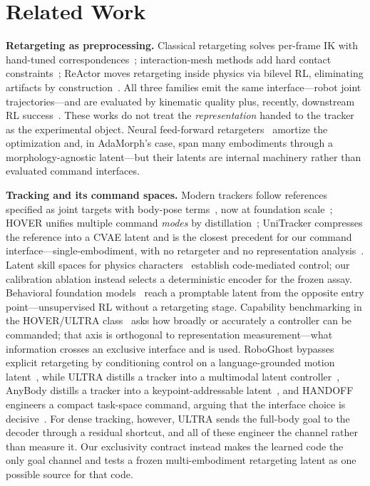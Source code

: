 \documentclass[conference]{IEEEtran}
\begin{document}
\section{Related Work}
\textbf{Retargeting as preprocessing.} Classical retargeting solves per-frame IK with
hand-tuned correspondences~\cite{gmr}; interaction-mesh methods add hard contact
constraints~\cite{omniretarget}; ReActor moves retargeting inside physics via bilevel RL,
eliminating artifacts by construction~\cite{reactor}. All three families emit the same
interface---robot joint trajectories---and are evaluated by kinematic quality plus,
recently, downstream RL success~\cite{gmr,omniretarget}. These works do not treat the
\emph{representation} handed to the tracker as the experimental object. Neural feed-forward
retargeters~\cite{ikmr,nmr,adamorph} amortize the optimization and, in AdaMorph's case,
span many embodiments through a morphology-agnostic latent---but their latents are
internal machinery rather than evaluated command interfaces.

\textbf{Tracking and its command spaces.} Modern trackers follow references specified as
joint targets with body-pose terms~\cite{beyondmimic,gmt,exbody2}, now at foundation
scale~\cite{sonic,humanoidgpt}; HOVER unifies multiple
command \emph{modes} by distillation~\cite{hover}; UniTracker compresses the reference
into a CVAE latent and is the closest precedent for our command interface---single-embodiment, with
no retargeter and no representation analysis~\cite{unitracker}. Latent skill spaces for
physics characters~\cite{pulse,maskedmimic,controlvae} establish code-mediated control;
our calibration ablation instead selects a deterministic encoder for the frozen assay.
Behavioral foundation models~\cite{bfmzero} reach a promptable
latent from the opposite entry point---unsupervised RL without a retargeting stage.
Capability benchmarking in the HOVER/ULTRA class~\cite{hover,ultra} asks how broadly or
accurately a controller can be commanded; that axis is orthogonal to representation
measurement---what information crosses an exclusive interface and is used. RoboGhost
bypasses explicit retargeting by conditioning control on a
language-grounded motion latent~\cite{roboghost}, while ULTRA distills a tracker into a
multimodal latent controller~\cite{ultra}, AnyBody distills a tracker into a
keypoint-addressable latent~\cite{anybody}, and HANDOFF engineers a compact task-space
command, arguing that the interface choice is decisive~\cite{handoff}. For dense
tracking, however, ULTRA sends the full-body goal to the decoder through a residual
shortcut, and all of these engineer the channel rather than measure it. Our exclusivity
contract instead makes the learned code the only goal channel and tests a frozen
multi-embodiment retargeting latent as one possible source for that code.
\end{document}

